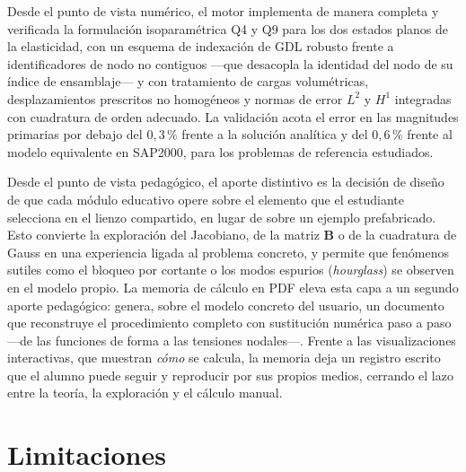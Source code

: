 Desde el punto de vista numérico, el motor implementa de manera completa y verificada la formulación isoparamétrica Q4 y Q9 para los dos estados planos de la elasticidad, con un esquema de indexación de GDL robusto frente a identificadores de nodo no contiguos —que desacopla la identidad del nodo de su índice de ensamblaje— y con tratamiento de cargas volumétricas, desplazamientos prescritos no homogéneos y normas de error $L^2$ y $H^1$ integradas con cuadratura de orden adecuado. La validación acota el error en las magnitudes primarias por debajo del $0{,}3\,\%$ frente a la solución analítica y del $0{,}6\,\%$ frente al modelo equivalente en SAP2000, para los problemas de referencia estudiados.

Desde el punto de vista pedagógico, el aporte distintivo es la decisión de diseño de que cada módulo educativo opere sobre el elemento que el estudiante selecciona en el lienzo compartido, en lugar de sobre un ejemplo prefabricado. Esto convierte la exploración del Jacobiano, de la matriz $\bm{B}$ o de la cuadratura de Gauss en una experiencia ligada al problema concreto, y permite que fenómenos sutiles como el bloqueo por cortante o los modos espurios (\emph{hourglass}) se observen en el modelo propio. La memoria de cálculo en PDF eleva esta capa a un segundo aporte pedagógico: genera, sobre el modelo concreto del usuario, un documento que reconstruye el procedimiento completo con sustitución numérica paso a paso —de las funciones de forma a las tensiones nodales—. Frente a las visualizaciones interactivas, que muestran \emph{cómo} se calcula, la memoria deja un registro escrito que el alumno puede seguir y reproducir por sus propios medios, cerrando el lazo entre la teoría, la exploración y el cálculo manual.

\section*{Limitaciones}

